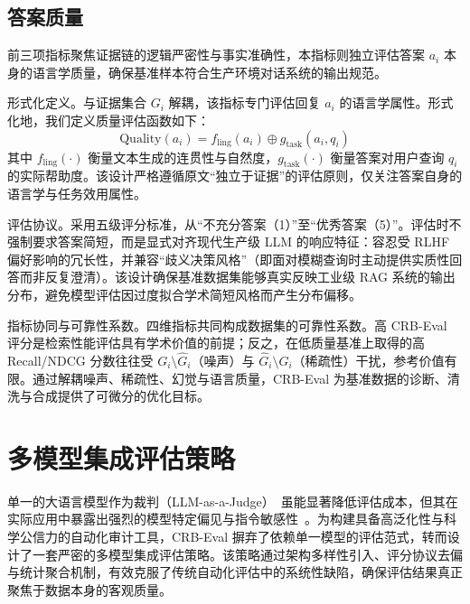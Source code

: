 \subsection{答案质量}



前三项指标聚焦证据链的逻辑严密性与事实准确性，本指标则独立评估答案 $a_i$ 本身的语言学质量，确保基准样本符合生产环境对话系统的输出规范。



形式化定义。与证据集合 $G_i$ 解耦，该指标专门评估回复 $a_i$ 的语言学属性。形式化地，我们定义质量评估函数如下：
\begin{equation}
    \text{Quality}(a_i) = f_{\text{ling}}(a_i) \oplus g_{\text{task}}(a_i, q_i)
\end{equation}
其中 $f_{\text{ling}}(\cdot)$ 衡量文本生成的连贯性与自然度，$g_{\text{task}}(\cdot)$ 衡量答案对用户查询 $q_i$ 的实际帮助度。该设计严格遵循原文“独立于证据”的评估原则，仅关注答案自身的语言学与任务效用属性。



评估协议。采用五级评分标准，从“不充分答案（1）”至“优秀答案（5）”。评估时不强制要求答案简短，而是显式对齐现代生产级 LLM 的响应特征：容忍受 RLHF 偏好影响的冗长性，并兼容“歧义决策风格”（即面对模糊查询时主动提供实质性回答而非反复澄清）。该设计确保基准数据集能够真实反映工业级 RAG 系统的输出分布，避免模型评估因过度拟合学术简短风格而产生分布偏移。



指标协同与可靠性系数。四维指标共同构成数据集的可靠性系数。高 CRB-Eval 评分是检索性能评估具有学术价值的前提；反之，在低质量基准上取得的高 Recall/NDCG 分数往往受 $G_i \setminus \hat{G}_i$（噪声）与 $\hat{G}_i \setminus G_i$（稀疏性）干扰，参考价值有限。通过解耦噪声、稀疏性、幻觉与语言质量，CRB-Eval 为基准数据的诊断、清洗与合成提供了可微分的优化目标。





\section{多模型集成评估策略}

\label{sec:ensemble_strategy}



单一的大语言模型作为裁判（LLM-as-a-Judge）~\citep{zheng2023judging,liu2023gpteval}虽能显著降低评估成本，但其在实际应用中暴露出强烈的模型特定偏见与指令敏感性~\citep{panickssery2024llm}。为构建具备高泛化性与科学公信力的自动化审计工具，CRB-Eval 摒弃了依赖单一模型的评估范式，转而设计了一套严密的多模型集成评估策略。该策略通过架构多样性引入、评分协议去偏与统计聚合机制，有效克服了传统自动化评估中的系统性缺陷，确保评估结果真正聚焦于数据本身的客观质量。



